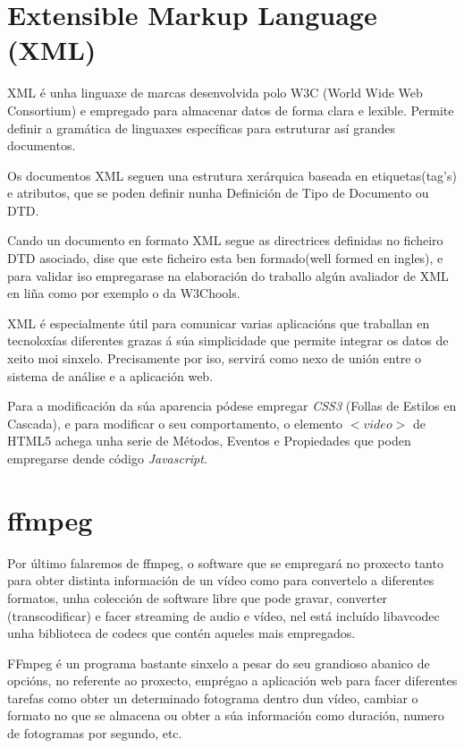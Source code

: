 \section{Extensible Markup Language (XML)}
    XML é unha linguaxe de marcas desenvolvida polo W3C (World Wide Web Consortium) e empregado
    para almacenar datos de forma clara e lexible. Permite definir a gramática de linguaxes 
    específicas para estruturar así grandes documentos.
    
    Os documentos XML seguen una estrutura xerárquica baseada en etiquetas(tag's) e atributos,
    que se poden definir nunha Definición de Tipo de Documento ou DTD. \cite{dtd-web-page}
    
    Cando un documento en formato XML segue as directrices definidas no ficheiro DTD asociado,
    dise que este ficheiro esta ben formado(well formed en ingles), e para validar iso empregarase
    na elaboración do traballo algún avaliador de XML en liña como por exemplo o da W3Chools.\cite{xml-validator}
    
    XML é especialmente útil para comunicar varias aplicacións que traballan en tecnoloxías 
    diferentes grazas á súa simplicidade que permite integrar os datos de xeito moi sinxelo. Precisamente
    por iso, servirá como nexo de unión entre o sistema de análise e a aplicación web. 
    
    Para a modificación da súa aparencia pódese empregar \emph{CSS3} (Follas de Estilos en 
    Cascada), e para modificar o seu comportamento, o elemento $<video>$ de HTML5 achega
    unha serie de Métodos, Eventos e Propiedades\cite{w3school-video-events} que poden
    empregarse dende código \emph{Javascript}.
    
\section{ffmpeg}
    Por último falaremos de ffmpeg, o software que se empregará no proxecto tanto para obter 
    distinta información de un vídeo como para convertelo a diferentes formatos, unha colección de 
    software libre que pode gravar, converter (transcodificar) e facer streaming de audio e vídeo,
    nel está incluído libavcodec unha biblioteca de codecs que contén aqueles mais empregados.
    
    FFmpeg é un programa bastante sinxelo a pesar do seu grandioso abanico de opcións, no referente
    ao proxecto, emprégao a aplicación web para facer diferentes tarefas como obter un determinado
    fotograma dentro dun vídeo, cambiar o formato no que se almacena ou obter a súa información como
    duración, numero de fotogramas por segundo, etc.
    